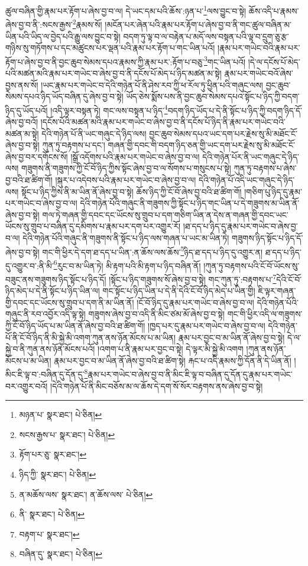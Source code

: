 ཚུལ་བཞིན་གྱི་རྣམ་པར་རྟོག་པ་ཞེས་བྱ་བ་ལ། དེ་ཡང་དམ་པའི་ཆོས་:ཉན་པ་\footnote{མཉན་པ་  སྣར་ཐང་།  པེ་ཅིན། }ལས་བྱུང་བ་སྟེ། ཆོས་འདི་པ་རྣམས་ཞེས་བྱ་བ་ནི་:སངས་རྒྱས་\footnote{སངས་རྒྱས་པ་  སྣར་ཐང་།  པེ་ཅིན། }རྣམས་སོ། །མངོན་པར་ཞེན་པའི་རྣམ་པར་རྟོག་པ་ཞེས་བྱ་བ་ནི་གང་ཚུལ་བཞིན་མ་ཡིན་པའི་ཡིད་ལ་བྱེད་པའི་རྒྱུ་ལས་བྱུང་བ་སྟེ། བདག་ཏུ་ལྟ་བ་ལ་བརྟེན་པ་མདོ་ལས་བསྟན་པའི་ལྟ་བ་དྲུག་ཅུ་རྩ་གཉིས་སུ་གཏོགས་པ་དང་མཚུངས་པར་ལྡན་པའི་རྣམ་པར་རྟོག་པ་གང་ཡིན་པའོ། །རྣམ་པར་གཡེང་བའི་རྣམ་པར་རྟོག་པ་ཞེས་བྱ་བ་ནི་བྱང་ཆུབ་སེམས་དཔའ་རྣམས་ཀྱི་རྣམ་པར་:རྟོག་པ་བཅུ་\footnote{རྟོག་པར་ཅུ་  སྣར་ཐང་། }གང་ཡིན་པའོ། །དེ་ལ་དངོས་པོ་མེད་པའི་མཚན་མའི་རྣམ་པར་གཡེང་བ་ཞེས་བྱ་བ་ནི་དངོས་པོ་མེད་པ་ཉིད་མཚན་མ་སྟེ། རྣམ་པར་གཡེང་བའོ་ཞེས་བྱས་ནས་སོ། །ཡང་རྣམ་པར་གཡེང་བ་དེའི་གཉེན་པོ་ནི་ཤེས་རབ་ཀྱི་ཕ་རོལ་ཏུ་ཕྱིན་པའི་གཞུང་ལས། བྱང་ཆུབ་སེམས་དཔའ་ཉིད་ཡོད་བཞིན་དུ་ཞེས་བྱ་བ་སྟེ། ཡོད་ཅེས་སྨོས་པས་ནི་བྱང་ཆུབ་སེམས་དཔའ་སྟོང་པ་ཉིད་ཀྱི་བདག་ཉིད་དུ་ཡོད་པའོ། །འདི་ལྟར་བསྟན་ཏེ། གང་ལས་བསྟན་པ་ཉིད་\footnote{ཉིད་ཀྱི་  སྣར་ཐང་།  པེ་ཅིན། }བདག་ཉིད་ཡོད་པ་དེ་ནི་སྟོང་པ་ཉིད་ཀྱི་བདག་ཉིད་དོ་ཞེས་བྱ་བའོ། །དངོས་པོའི་མཚན་མའི་རྣམ་པར་གཡེང་བ་ཞེས་བྱ་བ་ནི་དངོས་པོ་ཉིད་ནི་རྣམ་པར་གཡེང་བའི་མཚན་མ་སྟེ། དེའི་གཉེན་པོ་ནི་ཡང་གཞུང་དེ་ཉིད་ལས། བྱང་ཆུབ་སེམས་དཔའ་ཡང་དག་པར་རྗེས་སུ་མི་མཐོང་ངོ་ཞེས་བྱ་བ་སྟེ། ཀུན་ཏུ་བརྟགས་པ་དང་། གཞན་གྱི་དབང་གི་བདག་ཉིད་ཅན་གྱི་ཡང་དག་པར་རྗེས་སུ་མི་མཐོང་ངོ་ཞེས་བྱ་བར་དགོངས་སོ། །སྒྲོ་འདོགས་པའི་རྣམ་པར་གཡེང་བ་ཞེས་བྱ་བ་ལ། དེའི་གཉེན་པོར་ནི་ཡང་གཞུང་དེ་ཉིད་ལས། གཟུགས་ནི་གཟུགས་ཀྱི་ངོ་བོ་ཉིད་ཀྱིས་སྟོང་ཞེས་བྱ་བ་ལ་སོགས་པ་གསུངས་པ་སྟེ། ཀུན་ཏུ་བརྟགས་པ་ཞེས་བྱ་བའི་ཐ་ཚིག་གོ། །སྐུར་པ་འདེབས་པའི་རྣམ་པར་གཡེང་བ་ཞེས་བྱ་བ་ལ། དེའི་གཉེན་པོ་འདི་ཡང་གཞུང་དེ་ཉིད་ལས། སྟོང་པ་ཉིད་ཀྱིས་ནི་མ་ཡིན་ནོ་ཞེས་བྱ་བ་སྟེ། ཆོས་ཉིད་ཀྱི་ངོ་བོ་ཞེས་བྱ་བའི་ཐ་ཚིག་གོ། །གཅིག་པུ་ཉིད་དུ་རྣམ་པར་གཡེང་བ་ཞེས་བྱ་བ་ལ། དེའི་གཉེན་པོའི་གཞུང་ནི་གཟུགས་ཀྱི་སྟོང་པ་ཉིད་གང་ཡིན་པ་དེ་གཟུགས་མ་ཡིན་ནོ་ཞེས་བྱ་བ་སྟེ། གལ་ཏེ་གཞན་གྱི་དབང་དང་ཡོངས་སུ་གྲུབ་པ་དག་གཅིག་ཡིན་ན་དེས་ན་གཞན་གྱི་དབང་ཡང་ཡོངས་སུ་གྲུབ་པ་བཞིན་དུ་དམིགས་པ་རྣམ་པར་དག་པར་འགྱུར་རོ། །ཐ་དད་པ་ཉིད་དུ་རྣམ་པར་གཡེང་བ་ཞེས་བྱ་བ་ལ། དེའི་གཉེན་པོའི་གཞུང་ནི་གཟུགས་ནི་སྟོང་པ་ཉིད་ལས་གཞན་པ་ཡང་མ་ཡིན་ཏེ། གཟུགས་ཉིད་སྟོང་པ་ཉིད་དོ་ཞེས་བྱ་བ་སྟེ། གང་གི་ཕྱིར་དེ་དག་ཐ་དད་པ་ཡིན་:ན་ཆོས་ལས་ཆོས་\footnote{ན་མཆོས་ལས་  སྣར་ཐང་། ན་ཆོས་ལས་  པེ་ཅིན། }ཉིད་ཐ་དད་པ་ཉིད་དུ་འགྱུར་ན། ཐ་དད་པ་ཉིད་དུ་འགྱུར་བ་:ནི་མི་\footnote{ནི་  སྣར་ཐང་།  པེ་ཅིན། }རུང་བ་མ་ཡིན་ཏེ། མི་རྟག་པའི་མི་རྟག་པ་ཉིད་བཞིན་ནོ། །ཀུན་ཏུ་བརྟགས་པའི་ངོ་བོ་ཡོངས་སུ་བཟུང་ནས་གཟུགས་ཉིད་སྟོང་པ་ཉིད་དོ། །སྟོང་པ་ཉིད་གཟུགས་སོ་ཞེས་བྱ་བ་སྟེ། གང་ཀུན་ཏུ་:བརྟགས་པ་\footnote{བརྟག་པ་  སྣར་ཐང་། }དེའི་ངོ་བོ་ཉིད་མེད་པ་དེ་ནི་སྟོང་པ་ཉིད་ཡིན་ལ། གང་སྟོང་པ་ཉིད་ཡིན་པ་དེ་ནི་དེའི་ངོ་བོ་ཉིད་མེད་པ་ཡིན་གྱི། ཇི་ལྟར་གཞན་གྱི་དབང་དང་ཡོངས་སུ་གྲུབ་པ་དག་ནི་མ་ཡིན་ནོ། །ངོ་བོ་ཉིད་དུ་རྣམ་པར་གཡེང་བ་ཞེས་བྱ་བ་ལ། དེའི་གཉེན་པོའི་གཞུང་ནི་རབ་འབྱོར་འདི་ལྟ་སྟེ། གཟུགས་ཞེས་བྱ་བ་འདི་ནི་མིང་ཙམ་མོ་ཞེས་བྱ་བ་སྟེ། གང་གི་ཕྱིར་འདི་ལ་གཟུགས་ཀྱི་ངོ་བོ་ཉིད་ཡོད་པ་མ་ཡིན་ནོ་ཞེས་བྱ་བའི་ཐ་ཚིག་གོ། །ཁྱད་པར་དུ་རྣམ་པར་གཡེང་བ་ཞེས་བྱ་བ་ལ། དེའི་གཉེན་པོ་ནི་ངོ་བོ་ཉིད་ནི་མི་སྐྱེ་མི་འགག་ཀུན་ནས་ཉོན་མོངས་པ་མ་ཡིན། རྣམ་པར་བྱང་བ་མ་ཡིན་ནོ་ཞེས་བྱ་བ་སྟེ། དེ་ལ་སྐྱེ་བ་ནི་ཀུན་ནས་ཉོན་མོངས་པའོ། །འགག་པ་ནི་རྣམ་པར་བྱང་བ་སྟེ། དེ་ལྟར་མི་སྐྱེ་མི་འགག །ཀུན་ནས་ཉོན་མོངས་པ་མ་ཡིན། རྣམ་པར་བྱང་བ་མ་ཡིན་ནོ་ཞེས་བྱ་བའི་ཐ་ཚིག་སྟེ། རྐང་པ་འདི་རྣམས་ཀྱི་དོན་ནི་དེ་ཡིན་ནོ། །མིང་ཇི་ལྟ་བ་:བཞིན་དུ་དོན་དུ་\footnote{བཞིན་དུ་  སྣར་ཐང་།  པེ་ཅིན། }རྣམ་པར་གཡེང་བ་ཞེས་བྱ་བ་ནི་མིང་ཇི་ལྟ་བ་བཞིན་དུ་དོན་དུ་རྣམ་པར་གཡེང་བར་འགྱུར་བའོ། །དེའི་གཉེན་པོ་ནི་མིང་བཅོས་མ་ལ་ཆོས་དེ་དག་སོ་སོར་བརྟགས་ནས་ཞེས་བྱ་བ་སྟེ། 
